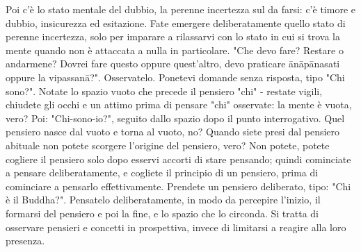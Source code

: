 Poi c'è lo stato mentale del dubbio, la perenne incertezza sul da farsi:
c'è timore e dubbio, insicurezza ed esitazione. Fate emergere
deliberatamente quello stato di perenne incertezza, solo per imparare a
rilassarvi con lo stato in cui si trova la mente quando non è attaccata
a nulla in particolare. "Che devo fare? Restare o andarmene? Dovrei fare
questo oppure quest'altro, devo praticare ānāpānasati oppure la
vipassanā?". Osservatelo. Ponetevi domande senza risposta, tipo "Chi
sono?". Notate lo spazio vuoto che precede il pensiero "chi" - restate
vigili, chiudete gli occhi e un attimo prima di pensare "chi" osservate:
la mente è vuota, vero? Poi: "Chi-sono-io?", seguito dallo spazio dopo
il punto interrogativo. Quel pensiero nasce dal vuoto e torna al vuoto,
no? Quando siete presi dal pensiero abituale non potete scorgere
l'origine del pensiero, vero? Non potete, potete cogliere il pensiero
solo dopo esservi accorti di stare pensando; quindi cominciate a pensare
deliberatamente, e cogliete il principio di un pensiero, prima di
cominciare a pensarlo effettivamente. Prendete un pensiero deliberato,
tipo: "Chi è il Buddha?". Pensatelo deliberatamente, in modo da
percepire l'inizio, il formarsi del pensiero e poi la fine, e lo spazio
che lo circonda. Si tratta di osservare pensieri e concetti in
prospettiva, invece di limitarsi a reagire alla loro presenza.

